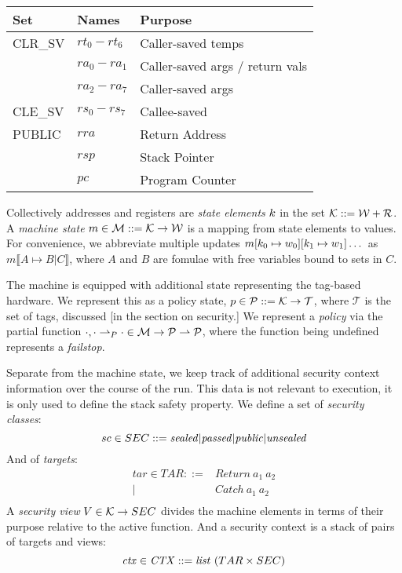 \documentclass[10pt,conference]{ieeetran}%
\theoremstyle{definition}
\begin{document}
\vspace{\abovedisplayskip}
\begin{tabular}{| l | l | l |}
  \hline
  Set & Names & Purpose \\
  \hline
  CLR\_SV & \(rt_0 - rt_6\) & Caller-saved temps \\
  & \(ra_0 - ra_1\) & Caller-saved args / return vals \\
  & \(ra_2 - ra_7\) & Caller-saved args \\
  \hline
  CLE\_SV & \(rs_0 - rs_7\) & Callee-saved \\
  \hline
  PUBLIC & \(rra\) & Return Address \\
  & \(rsp\) & Stack Pointer \\
  & \(pc\) & Program Counter \\
  \hline
\end{tabular}
\vspace{\abovedisplayskip}

Collectively addresses and registers are {\em state elements} \(k\)
in the set \({\mathcal K} ::= {\mathcal W} + {\mathcal R}\).
%
A {\em machine state} \(m \in {\mathcal M} ::= {\mathcal K} \rightarrow {\mathcal W}\)
is a mapping from state elements to values. For convenience, we abbreviate
multiple updates \(m[k_0 \mapsto w_0][k_1 \mapsto w_1]\dots\)
as \(m \llbracket A \mapsto B | C \rrbracket\), where \(A\) and \(B\)
are fomulae with free variables bound to sets in \(C\).

The machine is equipped with additional state representing the tag-based hardware.
We represent this as a policy state, \(p \in \mathcal{P} ::= {\mathcal K} \rightarrow \mathcal{T}\),
where \(\mathcal{T}\) is the set of tags, discussed [in the section on security.]
We represent a {\it policy} via the partial function
\(\cdot, \cdot \rightharpoonup_P \cdot \in {\mathcal M} \rightarrow \mathcal{P} \rightharpoonup \mathcal{P}\),
where the function being undefined represents a {\it failstop}.

Separate from the machine state, we keep track of additional security context
information over the course of the run. This data is not relevant to execution,
it is only used to define the stack safety property. We define a set of
{\it security classes}:
\[sc \in SEC ::= \mathit{sealed} | \mathit{passed} | \mathit{public} | \mathit{unsealed}\]
And of {\it targets}:
\[\begin{split}
tar \in TAR ::= & \mathit{Return} ~ a_1 ~ a_2 \\
| & \mathit{Catch} ~ a_1 ~ a_2 \\
\end{split}\]
A {\it security view} \(V \in {\mathcal K} \rightarrow SEC\) divides the machine
elements in terms of their purpose relative to the active function.
And a security context is a stack of pairs of targets and views:
\[\mathit{ctx} \in \mathit{CTX} ::= \mathit{list} ~ (TAR \times SEC)\]
\end{document}
